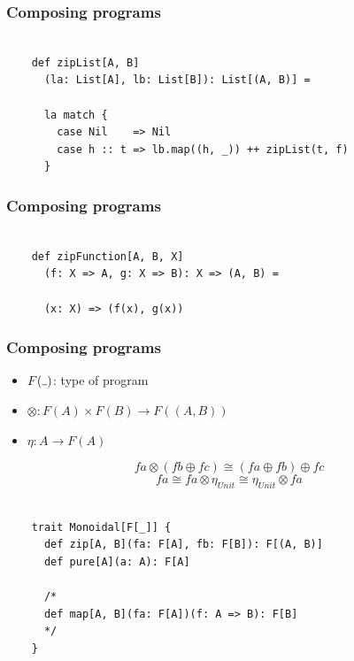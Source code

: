 \documentclass{beamer}
\newcommand{\gpause}{\vspace*{-\baselineskip}\pause}
\begin{document}
\begin{frame}[fragile]

  \frametitle{Composing programs}

  \begin{verbatim}

    def zipList[A, B]
      (la: List[A], lb: List[B]): List[(A, B)] =

      la match {
        case Nil    => Nil
        case h :: t => lb.map((h, _)) ++ zipList(t, f)
      }

  \end{verbatim}

\end{frame}

\begin{frame}[fragile]

  \frametitle{Composing programs}

  \begin{verbatim}

    def zipFunction[A, B, X]
      (f: X => A, g: X => B): X => (A, B) =

      (x: X) => (f(x), g(x))

  \end{verbatim}

\end{frame}

\begin{frame}[fragile]

  \frametitle{Composing programs}
  \large

  \begin{itemize}
    \item $F(\rule{1ex}{.4pt})$: type of program \pause
    \item $\otimes: F(A) \times F(B) \rightarrow F((A, B))$ \pause
    \item $\eta: A \rightarrow F(A)$ \pause
  \end{itemize}

  $$fa \otimes (fb \oplus fc) \cong (fa \oplus fb) \oplus fc$$ \gpause
  $$fa \cong fa \otimes \eta_{Unit} \cong \eta_{Unit} \otimes fa$$

\end{frame}

\begin{frame}[fragile]

  \begin{verbatim}

    trait Monoidal[F[_]] {
      def zip[A, B](fa: F[A], fb: F[B]): F[(A, B)]
      def pure[A](a: A): F[A]

      /*
      def map[A, B](fa: F[A])(f: A => B): F[B]
      */
    }

  \end{verbatim}

\end{frame}
\end{document}
